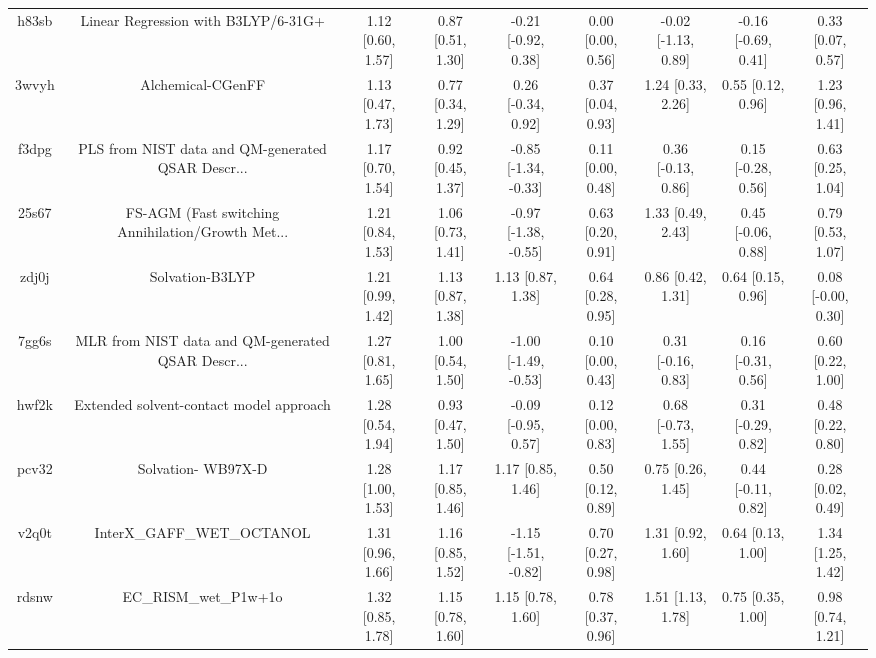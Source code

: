 \documentclass{article}
\begin{document}
\begin{center}
\begin{longtable}{|ccccccccc|}
 h83sb &                Linear Regression with B3LYP/6-31G+ &  1.12 [0.60, 1.57] &  0.87 [0.51, 1.30] &   -0.21 [-0.92, 0.38] &  0.00 [0.00, 0.56] &  -0.02 [-1.13, 0.89] &  -0.16 [-0.69, 0.41] &     0.33 [0.07, 0.57] \\
 3wvyh &                                  Alchemical-CGenFF &  1.13 [0.47, 1.73] &  0.77 [0.34, 1.29] &    0.26 [-0.34, 0.92] &  0.37 [0.04, 0.93] &    1.24 [0.33, 2.26] &    0.55 [0.12, 0.96] &     1.23 [0.96, 1.41] \\
 f3dpg &  PLS from NIST data and QM-generated QSAR Descr... &  1.17 [0.70, 1.54] &  0.92 [0.45, 1.37] &  -0.85 [-1.34, -0.33] &  0.11 [0.00, 0.48] &   0.36 [-0.13, 0.86] &   0.15 [-0.28, 0.56] &     0.63 [0.25, 1.04] \\
 25s67 &  FS-AGM (Fast switching Annihilation/Growth Met... &  1.21 [0.84, 1.53] &  1.06 [0.73, 1.41] &  -0.97 [-1.38, -0.55] &  0.63 [0.20, 0.91] &    1.33 [0.49, 2.43] &   0.45 [-0.06, 0.88] &     0.79 [0.53, 1.07] \\
 zdj0j &                                    Solvation-B3LYP &  1.21 [0.99, 1.42] &  1.13 [0.87, 1.38] &     1.13 [0.87, 1.38] &  0.64 [0.28, 0.95] &    0.86 [0.42, 1.31] &    0.64 [0.15, 0.96] &    0.08 [-0.00, 0.30] \\
 7gg6s &  MLR from NIST data and QM-generated QSAR Descr... &  1.27 [0.81, 1.65] &  1.00 [0.54, 1.50] &  -1.00 [-1.49, -0.53] &  0.10 [0.00, 0.43] &   0.31 [-0.16, 0.83] &   0.16 [-0.31, 0.56] &     0.60 [0.22, 1.00] \\
 hwf2k &            Extended solvent-contact model approach &  1.28 [0.54, 1.94] &  0.93 [0.47, 1.50] &   -0.09 [-0.95, 0.57] &  0.12 [0.00, 0.83] &   0.68 [-0.73, 1.55] &   0.31 [-0.29, 0.82] &     0.48 [0.22, 0.80] \\
 pcv32 &                                 Solvation- WB97X-D &  1.28 [1.00, 1.53] &  1.17 [0.85, 1.46] &     1.17 [0.85, 1.46] &  0.50 [0.12, 0.89] &    0.75 [0.26, 1.45] &   0.44 [-0.11, 0.82] &     0.28 [0.02, 0.49] \\
 v2q0t &                         InterX\_GAFF\_WET\_OCTANOL &  1.31 [0.96, 1.66] &  1.16 [0.85, 1.52] &  -1.15 [-1.51, -0.82] &  0.70 [0.27, 0.98] &    1.31 [0.92, 1.60] &    0.64 [0.13, 1.00] &     1.34 [1.25, 1.42] \\
 rdsnw &                              EC\_RISM\_wet\_P1w+1o &  1.32 [0.85, 1.78] &  1.15 [0.78, 1.60] &     1.15 [0.78, 1.60] &  0.78 [0.37, 0.96] &    1.51 [1.13, 1.78] &    0.75 [0.35, 1.00] &     0.98 [0.74, 1.21] \\

\end{longtable}
\end{center}
\end{document}

